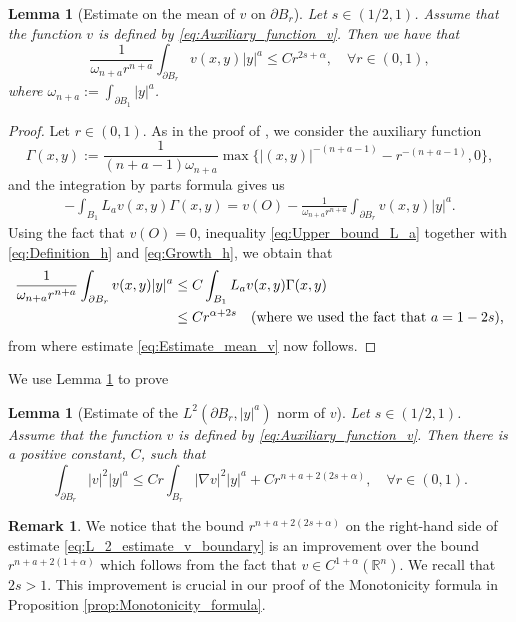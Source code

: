 \documentclass[11pt,reqno]{amsart}
\newtheorem{lem}[thm]{Lemma}
\theoremstyle{definition}
\newtheorem{rmk}[thm]{Remark}
\theoremstyle{remark}
\begin{document}
\begin{lem}[Estimate on the mean of $v$ on $\partial B_r$]
\label{lem:Estimate_mean_v}
Let $s\in (1/2,1)$. Assume that the function $v$ is defined by \eqref{eq:Auxiliary_function_v}. Then we have that
\begin{equation}
\label{eq:Estimate_mean_v}
 \frac{1}{\omega_{n+a}r^{n+a}} \int_{\partial B_r} v(x,y)|y|^a \leq C r^{2s+\alpha},\quad\forall r\in(0,1),
\end{equation}
where $\omega_{n+a}:=\int_{\partial B_1} |y|^a$.
\end{lem}

\begin{proof}
Let $r\in (0,1)$. As in the proof of \cite[Lemma 2.9]{Caffarelli_Salsa_Silvestre_2008}, we consider the auxiliary function
$$
\Gamma(x,y):=\frac{1}{(n+a-1)\omega_{n+a}}\max\{|(x,y)|^{-(n+a-1)}-r^{-(n+a-1)}, 0\},
$$
and the integration by parts formula gives us
\begin{align*}
-\int_{B_1} L_a v(x,y)\Gamma(x,y) = v(O) - \frac{1}{\omega_{n+a}r^{n+a}}  \int_{\partial B_r} v(x,y)|y|^a.
\end{align*}
Using the fact that $v(O)=0$, inequality \eqref{eq:Upper_bound_L_a} together with \eqref{eq:Definition_h} and \eqref{eq:Growth_h}, we obtain that
\begin{align*}
\frac{1}{\omega_{n+a}r^{n+a}}  \int_{\partial B_r} v(x,y)|y|^a &\leq C\int_{B_1} L_a v(x,y)\Gamma(x,y) \\
&\leq C r^{\alpha+2s}\quad\hbox{(where we used the fact that $a=1-2s$),}
\end{align*}
from where estimate \eqref{eq:Estimate_mean_v} now follows.
\end{proof}

We use Lemma \ref{lem:Estimate_mean_v} to prove

\begin{lem}[Estimate of the $L^2(\partial B_r, |y|^a)$ norm of $v$]
\label{lem:L_2_estimate_v_boundary}
Let $s\in (1/2,1)$. Assume that the function $v$ is defined by \eqref{eq:Auxiliary_function_v}. Then there is a positive constant, $C$, such that
\begin{equation}
\label{eq:L_2_estimate_v_boundary}
\int_{\partial B_r} |v|^2 |y|^a \leq C r\int_{B_r}|\nabla v|^2 |y|^a + C r^{n+a+2(2s+\alpha)},\quad\forall r\in (0,1).
\end{equation}
\end{lem}

\begin{rmk}
We notice that the bound $r^{n+a+2(2s+\alpha)}$ on the right-hand side of estimate \eqref{eq:L_2_estimate_v_boundary} is an improvement over the bound $r^{n+a+2(1+\alpha)}$ which follows from the fact that $v\in C^{1+\alpha}({\mathbb{R}}^n)$. We recall that $2s>1$. This improvement is crucial in our proof of the Monotonicity formula in Proposition \ref{prop:Monotonicity_formula}.
\end{rmk}
\end{document}
